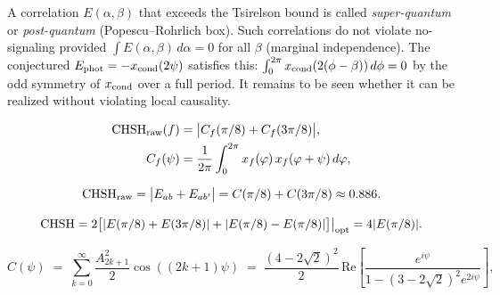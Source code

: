 \begin{remark}
\label{P9:rem:nosignaling}
A correlation $E(\alpha,\beta)$ that exceeds the Tsirelson bound is
called \emph{super-quantum} or \emph{post-quantum} (Popescu--Rohrlich box).
Such correlations do not violate no-signaling provided
$\int E(\alpha,\beta)\,d\alpha = 0$ for all $\beta$ (marginal independence).
The conjectured $E_\mathrm{phot} = -x_{\mathrm{cond}}(2\psi)$ satisfies this:
$\int_0^{2\pi}x_{\mathrm{cond}}(2(\phi-\beta))\,d\phi = 0$ by the odd symmetry of
$x_{\mathrm{cond}}$ over a full period. It remains to be seen whether it can be realized without violating local causality.
\end{remark}

\begin{align}
      \mathrm{CHSH}_\mathrm{raw}(f)
      &= \bigl|C_f(\pi/8) + C_f(3\pi/8)\bigr|,
      \\
      C_f(\psi)
      &= \frac{1}{2\pi}\int_0^{2\pi} x_f(\varphi)\,x_f(\varphi+\psi)\,d\varphi,
      \nonumber
    \end{align}

\begin{equation}
  \mathrm{CHSH}_\mathrm{raw}
  = \bigl|E_{ab}+E_{ab'}\bigr|
  = C(\pi/8)+C(3\pi/8)
  \approx 0.886.
  \label{P9:eq:CHSH_raw_value}
\end{equation}

\begin{equation}
  \mathrm{CHSH} = 2\bigl[|E(\pi/8)+E(3\pi/8)| + |E(\pi/8)-E(\pi/8)|\bigr]\big|_\mathrm{opt}
  = 4|E(\pi/8)|.
  \label{P9:eq:CHSH_simplified}
\end{equation}

\begin{equation}
  C(\psi)
  \;=\; \sum_{k=0}^{\infty}\frac{A_{2k+1}^2}{2}\cos((2k+1)\psi)
  \;=\; \frac{(4-2\sqrt{2})^2}{2}\,
        \mathrm{Re}\!\left[\frac{e^{i\psi}}{1-(3-2\sqrt{2})^2 e^{2i\psi}}\right],
  \label{P9:eq:C_exact}
\end{equation}

